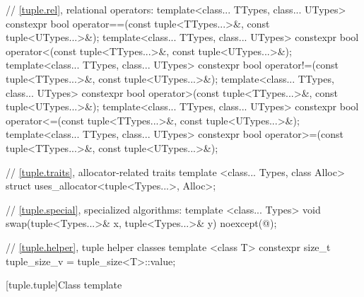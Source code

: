 \begin{codeblock}
{  // \ref{tuple.rel}, relational operators:
  template<class... TTypes, class... UTypes>
    constexpr bool operator==(const tuple<TTypes...>&, const tuple<UTypes...>&);
  template<class... TTypes, class... UTypes>
    constexpr bool operator<(const tuple<TTypes...>&, const tuple<UTypes...>&);
  template<class... TTypes, class... UTypes>
    constexpr bool operator!=(const tuple<TTypes...>&, const tuple<UTypes...>&);
  template<class... TTypes, class... UTypes>
    constexpr bool operator>(const tuple<TTypes...>&, const tuple<UTypes...>&);
  template<class... TTypes, class... UTypes>
    constexpr bool operator<=(const tuple<TTypes...>&, const tuple<UTypes...>&);
  template<class... TTypes, class... UTypes>
    constexpr bool operator>=(const tuple<TTypes...>&, const tuple<UTypes...>&);

  // \ref{tuple.traits}, allocator-related traits
  template <class... Types, class Alloc>
    struct uses_allocator<tuple<Types...>, Alloc>;

  // \ref{tuple.special}, specialized algorithms:
  template <class... Types>
    void swap(tuple<Types...>& x, tuple<Types...>& y) noexcept(@\seebelow@);

  // \ref{tuple.helper}, tuple helper classes
  template <class T> constexpr size_t tuple_size_v
    = tuple_size<T>::value;
}
\end{codeblock}

[tuple.tuple]{Class template }

